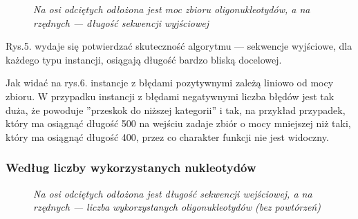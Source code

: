 \documentclass{article}
\begin{document}
\begin{figure}[!htbp]
\caption{\textit{Na osi odciętych odłożona jest moc zbioru oligonukleotydów, a na rzędnych --- długość sekwencji wyjściowej}}
\end{figure}

Rys.5. wydaje się potwierdzać skuteczność algorytmu --- sekwencje wyjściowe, dla każdego typu instancji, osiągają długość bardzo bliską docelowej.

Jak widać na rys.6. instancje z błędami pozytywnymi zależą liniowo od mocy zbioru.
W przypadku instancji z błędami negatywnymi liczba błędów jest tak duża, że powoduje ''przeskok do niższej kategorii'' i tak, na przykład przypadek, który ma osiągnąć długość 500 na wejściu zadaje zbiór o mocy mniejszej niż taki, który ma osiągnąć długość 400, przez co charakter funkcji nie jest widoczny.

\subsubsection{Według liczby wykorzystanych nukleotydów}

\begin{figure}[!htbp]
\caption{\textit{Na osi odciętych odłożona jest długość sekwencji wejściowej, a na rzędnych --- liczba wykorzystanych oligonukleotydów (bez powtórzeń)}}
\end{figure}
\end{document}
